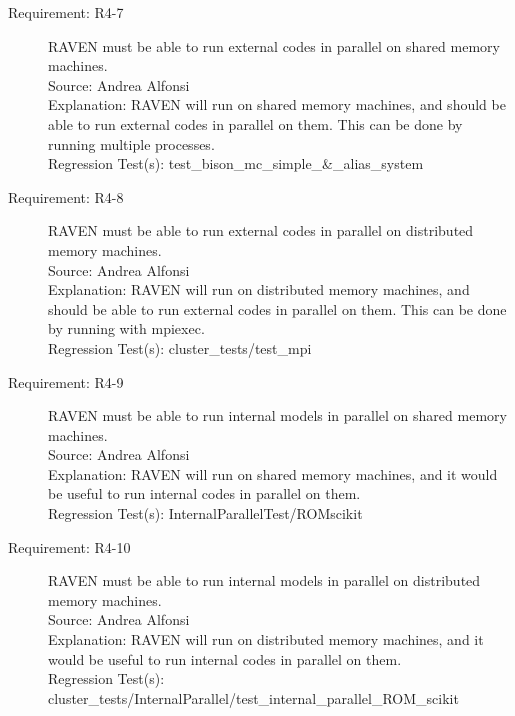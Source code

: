\documentclass{article}
\newcommand{\requirement}[5]{\item[Requirement: #1] #2 \\Source: #3\\Explanation: #4\\Regression Test(s): #5}
\begin{document}
\begin{description}
\requirement{R4-7}{RAVEN must be able to run external codes in parallel on shared memory machines.}
{Andrea Alfonsi}
{RAVEN will run on shared memory machines, and should be able to run external codes in parallel on them.  This can be done by running multiple processes.}
{test\_bison\_mc\_simple\_\&\_alias\_system}

\requirement{R4-8}{RAVEN must be able to run external codes in parallel on distributed memory machines.}
{Andrea Alfonsi}
{RAVEN will run on distributed memory machines, and should be able to run external codes in parallel on them.  This can be done by running with mpiexec.}
{cluster\_tests/test\_mpi}

\requirement{R4-9}{RAVEN must be able to run internal models in parallel on shared memory machines.}
{Andrea Alfonsi}
{RAVEN will run on shared memory machines, and it would be useful to run internal codes in parallel on them.}
{InternalParallelTest/ROMscikit}

\requirement{R4-10}{RAVEN must be able to run internal models in parallel on distributed memory machines.}
{Andrea Alfonsi}
{RAVEN will run on distributed memory machines, and it would be useful to run internal codes in parallel on them.}
{cluster\_tests/InternalParallel/test\_internal\_parallel\_ROM\_scikit}

\end{description}
\end{document}
